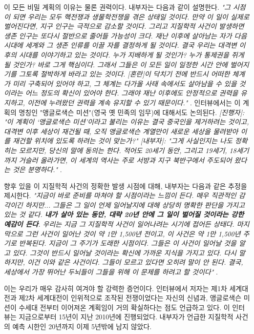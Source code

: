 \documentclass[10pt,twocolumn,letterpaper]{article}
\begin{document}
이 모든 비밀 계획의 이유는 물론 권력이다. 내부자는 다음과 같이 설명한다. \textit{"그 시점이 되면 우리는 모두 핵전쟁과 생물학전쟁을 겪은 상태일 것이다. 만약 이 일이 실제로 벌어진다면, 지구 인구는 극적으로 감소할 것이다. 그리고 지질학적 사건이 발생하면 생존 인구는 또다시 절반으로 줄어들 가능성이 크다. 재난 이후에 살아남는 자가 다음 시대에 세계와 그 생존 인류를 이끌 자를 결정하게 될 것이다. 결국 우리는 대격변 이후의 시대를 이야기하고 있는 것이다. 누가 지배하게 될 것인가? 누가 통제권을 쥐게 될 것인가? 바로 그게 핵심이다. 그래서 그들은 이 모든 일이 일정한 시간 안에 벌어지기를 그토록 절박하게 바라고 있는 것이다. [혼란]이 닥치기 전에 반드시 어떠한 체계가 미리 구축되어 있어야 하고, 그 체계는 다가올 사태 속에서도 살아남을 수 있을 것이라는 어느 정도의 확신이 있어야 한다. 그래야 재난 이후에도 안정적으로 권력을 유지하고, 이전에 누려왔던 권력을 계속 유지할 수 있기 때문이다."} \cite{4}. 인터뷰에서는 이 계획의 명칭인 "앵글로색슨 미션"(영국 옛 민족의 임무)에 대해서도 논의된다. \textit{[진행자]: "이 계획이 ‘앵글로색슨 미션’이라고 불리는 이유는 결국 중국인을 제거하려는 것이고, 대격변 이후 세상이 재건될 때, 오직 앵글로색슨 계열만이 새로운 세상을 물려받아 이를 재건할 위치에 있도록 하려는 것이 맞는가?" [내부자]: "그게 사실인지는 나도 정확히는 모르지만, 당신의 말에 동의는 한다. 적어도 20세기 동안, 그리고 19세기, 18세기까지 거슬러 올라가면, 이 세계의 역사는 주로 서방과 지구 북반구에서 주도되어 왔다는 것은 분명하다."} \cite{4}.

향후 있을 이 지질학적 사건의 정확한 발생 시점에 대해, 내부자는 다음과 같은 추정을 제시한다. \textit{"지금이 바로 준비를 마쳐야 할 시점이라는 느낌이 든다. 매우 직관적인 감각이긴 하지만... 그들은 그 일이 언제 일어날지에 대해 상당히 명확한 판단을 가지고 있는 것 같다. \textbf{내가 살아 있는 동안, 대략 20년 안에 그 일이 벌어질 것이라는 강한 예감이 든다}. 우리는 지금 그 지질학적 사건이 일어나려는 시기에 접어든 상태다. 마지막으로 그런 사건이 일어난 것이 약 1만 1,500년 전이고, 이 사건은 약 1만 1,500년 주기로 반복된다. 지금이 그 주기가 도래한 시점이다. 그들은 이 사건이 일어날 것을 알고 있다. 그것이 반드시 일어날 것이라는 확신에 가까운 지식을 가지고 있다. 다시 말하지만, 이건 이와 같은 사건이다. 그들이 모르고 있다면 오히려 말이 안 된다. 결국, 세상에서 가장 뛰어난 두뇌들이 그들을 위해 이 문제를 하려고 할 것이다"} \cite{4}.

이는 우리가 매우 감사히 여겨야 할 강력한 증언이다. 인터뷰에서 저자는 제1차 세계대전과 제2차 세계대전이 인위적으로 조작된 전쟁이었다는 자신의 신념과, 앵글로색슨 미션이 수세대 전부터 이어져온 계획임이 거의 확실하다는 점도 언급하고 있다. 이 인터뷰는 지금으로부터 15년이 지난 2010년에 진행되었다. 내부자가 언급한 지질학적 사건의 예측 시한인 20년까지 이제 5년밖에 남지 않았다.
\end{document}
